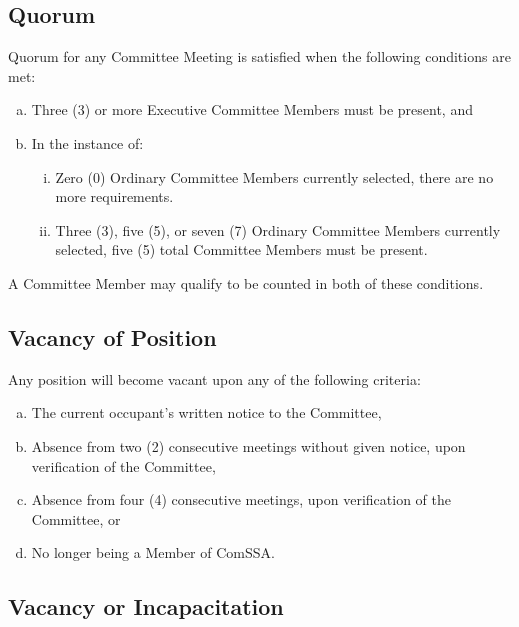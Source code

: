 \documentclass[a4paper,12pt]{article}
\begin{document}
\subsection{Quorum}

Quorum for any Committee Meeting is satisfied when the following conditions are met:

\begin{enumerate}[a)]
	\item Three (3) or more Executive Committee Members must be present, and
	\item In the instance of:
	\begin{enumerate}[i)]
		\item Zero (0) Ordinary Committee Members currently selected, there are no more requirements.
		\item Three (3), five (5), or seven (7) Ordinary Committee Members currently selected, five (5) total Committee Members must be present.
	\end{enumerate}
\end{enumerate}

A Committee Member may qualify to be counted in both of these conditions.

\subsection{Vacancy of Position}

Any position will become vacant upon any of the following criteria:

\begin{enumerate}[a)]
	\item The current occupant's written notice to the Committee,
	\item Absence from two (2) consecutive meetings without given notice, upon verification of the Committee,
	\item Absence from four (4) consecutive meetings, upon verification of the Committee, or
	\item No longer being a Member of ComSSA.
\end{enumerate}

\subsection{Vacancy or Incapacitation}
\end{document}
